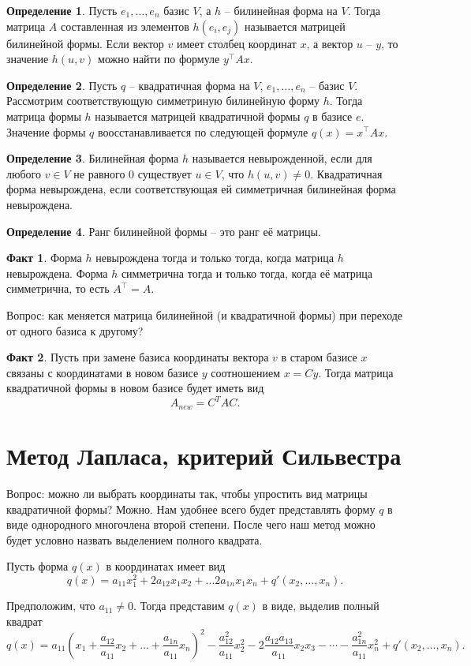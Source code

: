 \documentclass[10pt,a4paper,oneside]{book}
\theoremstyle{definition}
\newtheorem{defn}{Определение}
\newtheorem*{fact}{Факт}
\def\dfn{\begin{defn}}
\def\edfn{\end{defn}}
\def\fct{\begin{fact}}
\def\efct{\end{fact}}
\begin{document}
\dfn Пусть $e_1, \dots, e_n$ базис $V$, а $h$ -- билинейная форма на $V$. Тогда матрица $A$ составленная из элементов $h(e_i,e_j)$ называется матрицей билинейной формы.
Если вектор $v$ имеет столбец координат $x$, а вектор $u$ -- $y$, то значение $h(u,v)$ можно найти по формуле $y^{\top}Ax$.
\edfn


\dfn Пусть $q$ -- квадратичная форма на $V$, $e_1,\dots, e_n$ -- базис $V$. Рассмотрим соответствующую симметриную билинейную форму $h$. Тогда матрица формы $h$ называется матрицей квадратичной формы $q$ в базисе $e$. Значение формы $q$ воосстанавливается по следующей формуле $q(x)=x^{\top}Ax$.  
\edfn

\dfn Билинейная форма $h$ называется невырожденной, если для любого $v\in V$ не равного 0 существует $u\in V$, что $h(u,v)\neq 0$. Квадратичная форма невырождена, если соответствующая ей симметричная билинейная форма невырождена.
\edfn

\dfn Ранг билинейной формы -- это ранг её матрицы.
\edfn

\fct Форма $h$ невырождена тогда и только тогда, когда матрица $h$ невырождена. Форма $h$ симметрична тогда и только тогда, когда её матрица симметрична, то есть $A^{\top}=A$.
\efct


Вопрос: как меняется матрица билинейной (и квадратичной формы) при переходе от одного базиса к другому?

\fct Пусть при замене базиса  координаты вектора $v$ в старом базисе $x$ связаны с координатами в новом базисе $y$  соотношением $x=Cy$. Тогда  матрица квадратичной формы в новом базисе будет иметь вид 
$$A_{new}=C^{T}AC.$$
\efct




\section{Метод Лапласа, критерий Сильвестра}

Вопрос: можно ли выбрать координаты так, чтобы упростить вид матрицы квадратичной формы? Можно. Нам удобнее всего будет представлять форму $q$ в виде однородного многочлена второй степени. После чего наш метод можно будет условно назвать выделением полного квадрата.

Пусть форма $q(x)$ в координатах имеет вид
$$q(x)= a_{11}x_1^2+ 2a_{12}x_1x_2 + \dots 2a_{1n}x_1x_n  + q'(x_2, \dots, x_n).$$

 Предположим, что $a_{11}\neq 0$. Тогда представим $q(x)$ в виде, выделив полный квадрат 
$$q(x)= a_{11}\left(x_1+\frac{a_{12}}{a_{11}}x_2 + \dots +\frac{a_{1n}}{a_{11}}x_n\right)^2 - \frac{a_{12}^2}{a_{11}}x_2^2 - 2\frac{a_{12}a_{13}}{a_{11}}x_2x_3 - \cdots - \frac{a_{1n}^2}{a_{11}}x_n^2 + q'(x_2,\dots,x_n).$$
\end{document}
